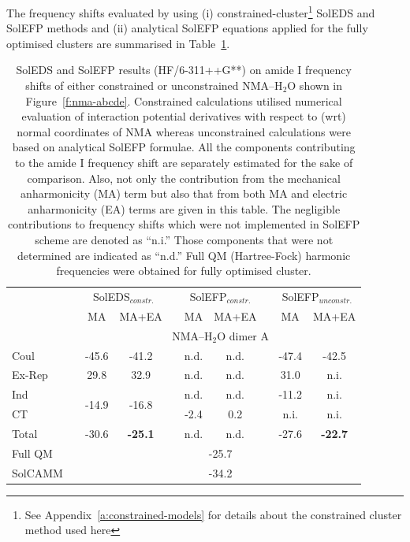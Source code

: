 \documentclass[a4paper,titlepage,twoside,fleqn,12pt]{book}
\begin{document}
\begin{refsection}
The frequency
shifts evaluated by using (i) constrained\hyp{}cluster\footnote{See Appendix~\ref{a:constrained-models} for details about
the constrained cluster method used here} SolEDS and
SolEFP methods and (ii) analytical SolEFP equations applied
for the fully optimised clusters are summarised in Table~\ref{t:amide-I-soleds-solefp}.
%
\begin{table}[t!]
\caption{
SolEDS and SolEFP results (HF/6-311++G**) 
on amide I frequency shifts of either constrained or unconstrained NMA--H$_2$O%
shown in Figure~\ref{f:nma-abcde}. 
Constrained calculations
utilised numerical evaluation of interaction potential derivatives with respect to (wrt) normal coordinates of NMA whereas unconstrained calculations were
based on analytical SolEFP formulae. All the components contributing to the amide I frequency shift are separately
estimated for the sake of comparison. Also, not only the contribution from the mechanical anharmonicity (MA) term but also that from both MA and electric
anharmonicity (EA) terms are given in this table. The negligible contributions to frequency shifts which were not implemented in SolEFP scheme are denoted
as “n.i.” Those components that were not determined are indicated
as “n.d.” Full QM (Hartree-Fock) harmonic frequencies were obtained for fully optimised cluster.
\label{t:amide-I-soleds-solefp}}
\begin{tabular*}{1.0\textwidth}{@{\extracolsep{\fill} } l ccccccccc }
\hline\hline
 && \multicolumn{2}{c}{SolEDS$_{constr.}$} && \multicolumn{2}{c}{SolEFP$_{constr.}$} && \multicolumn{2}{c}{SolEFP$_{unconstr.}$} \\
\cline{3-4}
\cline{6-7}
\cline{9-10}
 && MA & MA+EA && MA & MA+EA && MA & MA+EA \\
\hline
 && \multicolumn{8}{c}{NMA--H$_2$O dimer A} \\
\cline{3-10}
Coul   && -45.6 & -41.2 &&  n.d. & n.d. && -47.4 & -42.5 \\
Ex-Rep &&  29.8 &  32.9 &&  n.d. & n.d. &&  31.0 &  n.i. \\
Ind    &&  \multirow{2}{*}{-14.9}& \multirow{2}{*}{-16.8} && n.d. & n.d. && -11.2 & n.i. \\
CT     &&       &       && -2.4  & 0.2  &&  n.i. &  n.i. \\
Total  && -30.6 & \bf{-25.1} &&  n.d. & n.d. && -27.6 & \bf{-22.7} \\
Full QM&& \multicolumn{8}{c}{-25.7} \\
SolCAMM&& \multicolumn{8}{c}{-34.2} \\

\end{tabular*}
\end{table}
\end{refsection}
\end{document}
